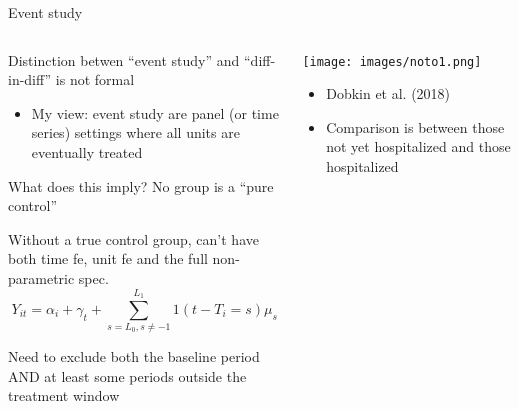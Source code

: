 \documentclass[notes,11pt, aspectratio=169]{beamer}
\newenvironment{wideitemize}{\itemize\addtolength{\itemsep}{10pt}}{\enditemize}
\begin{document}
\begin{frame}{Event study}
  \begin{columns}[T] %
    \begin{column}{0.6\textwidth}
      \begin{wideitemize}
      \item Distinction betwen ``event study'' and ``diff-in-diff'' is not formal
        \begin{itemize}
        \item My view: event study are panel (or time
          series) settings where all units are eventually treated
        \end{itemize}
      \item What does this imply? No group is a ``pure control''
      \item Without a true control group, can't have both time fe,
        unit fe and the full non-parametric spec. 
        \begin{equation*}
          Y_{it} = \alpha_{i} + \gamma_{t} + \sum_{s = L_{0}, s\not=-1}^{L_{1}}1(t-T_{i} = s)\mu_{s}
        \end{equation*}
        \vspace{-15pt}
        \item Need to exclude both the baseline period AND at least
          some periods outside the treatment window
        \end{wideitemize}
      \end{column}%
      \hfill%
      \begin{column}{.4\textwidth}
        \texttt{[image: images/noto1.png]}\\
        \begin{itemize}
        \item Dobkin et al. (2018)
        \item Comparison is between those not yet hospitalized and those hospitalized
        \end{itemize}
      \end{column}%
    \end{columns}
  \end{frame}
\end{document}
